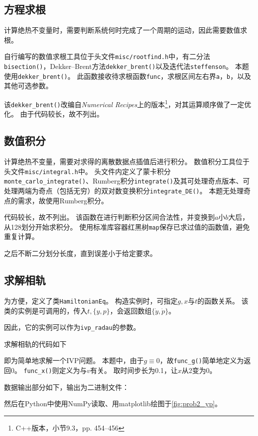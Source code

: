 \documentclass[a4paper,unicode]{report}
\begin{document}
\subsection{方程求根}
计算绝热不变量时，需要判断系统何时完成了一个周期的运动，因此需要数值求根。

自行编写的数值求根工具位于头文件\verb|misc/rootfind.h|中，有二分法\verb|bisection()|，Dekker--Brent方法\verb|dekker_brent()|以及迭代法\verb|steffenson|。
本题使用\verb|dekker_brent()|。
此函数接收待求根函数\verb|func|，求根区间左右界\verb|a|，\verb|b|，以及其他可选参数。

该\verb|dekker_brent()|改编自\emph{Numerical Recipes}上的版本\footnote{\textsf{C++}版本，小节9.3，pp. 454--456}，对其运算顺序做了一定优化。
由于代码较长，故不列出。

\subsection{数值积分}
计算绝热不变量，需要对求得的离散数据点插值后进行积分。
数值积分工具位于头文件\verb|misc/integral.h|中。
头文件内定义了蒙卡积分\verb|monte_carlo_integrate()|、Rumberg积分\verb|integrate()|及其可处理奇点版本、可处理两端为奇点（包括无穷）的双对数变换积分\verb|integrate_DE()|。
本题无处理奇点的需求，故使用Rumberg积分。

代码较长，故不列出。
该函数在进行判断积分区间合法性，并变换到$a$小$b$大后，从128划分开始求积分。
使用标准库容器红黑树\verb|map|保存已求过值的函数值，避免重复计算。

之后不断二分划分长度，直到误差小于给定要求。
\subsection{求解相轨}
为方便，定义了类\verb|HamiltonianEq|。
构造实例时，可指定$g, x$与$t$的函数关系。
该类的实例是可调用的，传入$t, \{y, p\}$，会返回数组$\{\dot{y}, \dot{p}\}$。
{
    \linespread{1.0}
    
}
因此，它的实例可以作为\verb|ivp_radau|的参数。

求解相轨的代码如下
{
    \linespread{1.0}
    
}
即为简单地求解一个IVP问题。
本题中，由于$g\equiv 0$，故\verb|func_g()|简单地定义为返回0。
\verb|func_x()|则定义为与$v$有关。
取时间步长为0.1，让$x$从2变为0。

数据输出部分如下，输出为二进制文件：
{
    \linespread{1.0}
    
}
然后在\textsf{Python}中使用\textsf{NumPy}读取、用\textsf{matplotlib}绘图于\autoref{fig:prob2_yp}。
\end{document}
